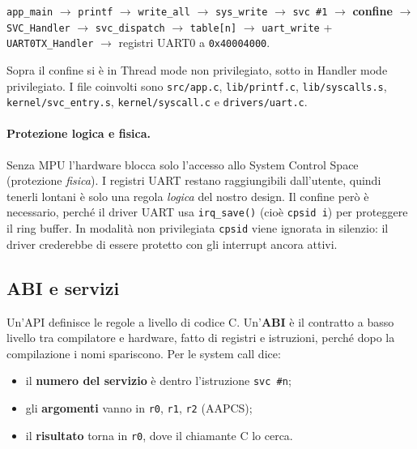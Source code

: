 \texttt{app\_main} $\rightarrow$ \texttt{printf} $\rightarrow$ \texttt{write\_all} $\rightarrow$ \texttt{sys\_write} $\rightarrow$ \texttt{svc \#1} $\rightarrow$ \textbf{confine} $\rightarrow$ \texttt{SVC\_Handler} $\rightarrow$ \texttt{svc\_dispatch} $\rightarrow$ \texttt{table[n]} $\rightarrow$ \texttt{uart\_write} + \texttt{UART0TX\_Handler} $\rightarrow$ registri UART0 a \texttt{0x40004000}.
 
Sopra il confine si è in Thread mode non privilegiato, sotto in Handler mode privilegiato. I file coinvolti sono \texttt{src/app.c}, \texttt{lib/printf.c}, \texttt{lib/syscalls.s}, \texttt{kernel/svc\_entry.s}, \texttt{kernel/syscall.c} e \texttt{drivers/uart.c}.
 
\paragraph*{Protezione logica e fisica.} Senza MPU l'hardware blocca solo l'accesso allo System Control Space (protezione \textit{fisica}). I registri UART restano raggiungibili dall'utente, quindi tenerli lontani è solo una regola \textit{logica} del nostro design. Il confine però è necessario, perché il driver UART usa \texttt{irq\_save()} (cioè \texttt{cpsid i}) per proteggere il ring buffer. In modalità non privilegiata \texttt{cpsid} viene ignorata in silenzio: il driver crederebbe di essere protetto con gli interrupt ancora attivi.
 
\subsection*{ABI e servizi}
Un'API definisce le regole a livello di codice C. Un'\textbf{ABI} è il contratto a basso livello tra compilatore e hardware, fatto di registri e istruzioni, perché dopo la compilazione i nomi spariscono. Per le system call dice:
\begin{itemize}
    \item il \textbf{numero del servizio} è dentro l'istruzione \texttt{svc \#n};
    \item gli \textbf{argomenti} vanno in \texttt{r0}, \texttt{r1}, \texttt{r2} (AAPCS);
    \item il \textbf{risultato} torna in \texttt{r0}, dove il chiamante C lo cerca.
\end{itemize}
 
